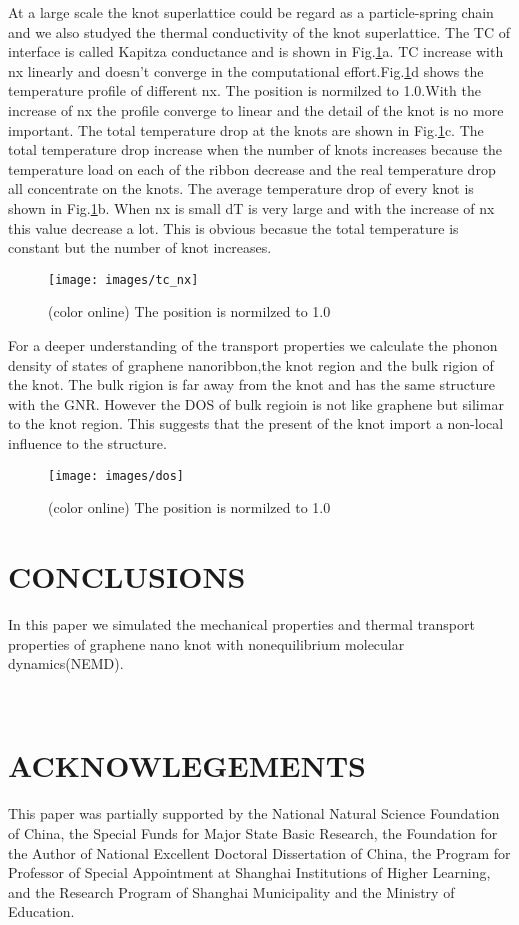 \documentclass[%
 reprint,
 amsmath,amssymb,
 aps,
prb,
]{revtex4-1}
\begin{document}
At a large scale the knot superlattice could be regard as a particle-spring chain and we also studyed the thermal conductivity of the knot superlattice.
The TC of interface is  called Kapitza conductance and is shown in Fig.\ref{fig:tc_nx}a. TC increase with nx linearly and doesn't converge in the computational effort.Fig.\ref{fig:tc_nx}d shows the temperature profile of different nx. The position is normilzed to 1.0.With the increase of nx the profile converge to linear and the detail of the knot is no more important.
The total temperature drop at the knots are shown in Fig.\ref{fig:tc_nx}c. The total temperature drop increase when the number of knots increases because the temperature load on each of the ribbon decrease and the real temperature drop all concentrate on the knots. The average temperature drop of every knot is shown in Fig.\ref{fig:tc_nx}b. When nx is small dT is very large and with the increase of nx this value decrease a lot. This is obvious becasue the total temperature is constant but the number of knot increases.

\begin{figure}[b]
  \texttt{[image: images/tc\_nx]}
  \caption{\label{fig:tc_nx}  (color online) The position is normilzed to 1.0 }
\end{figure}

For a deeper understanding of the transport properties we calculate the phonon density of states of graphene nanoribbon,the knot region and the bulk rigion of the knot. The bulk rigion is far away from the knot and has the same structure with the GNR. However the DOS of bulk regioin is not like graphene but silimar to the knot region. This suggests that the present of the knot import a non-local influence to the structure.

\begin{figure}[b]
  \texttt{[image: images/dos]}
  \caption{\label{fig:dos}  (color online) The position is normilzed to 1.0 }
\end{figure}

\section{CONCLUSIONS}
In this paper we simulated the mechanical properties and  thermal transport properties of graphene nano knot with nonequilibrium molecular dynamics(NEMD).

\quad \\
\section{ACKNOWLEGEMENTS}
This paper was partially supported by the National Natural Science Foundation of China, the Special Funds for Major State Basic Research, the Foundation for the Author of National Excellent Doctoral Dissertation of China, the Program for Professor of Special Appointment at Shanghai Institutions of Higher Learning, and the Research Program of Shanghai Municipality and the Ministry of Education.



\end{document}
